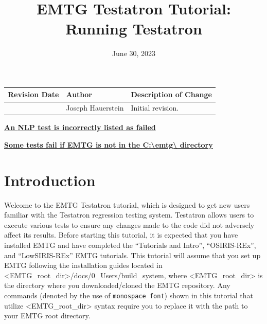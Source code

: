 \documentclass[11pt]{article}
\title{\Huge EMTG Testatron Tutorial: Running Testatron}
\newcommand{\knownissue}[3]
{
	\refstepcounter{knownissues}
	\par\noindent\textbf{\hyperref[#2_b]{\theknownissues\quad #1}}\label{#2_h}
	\textbf{\hfill\pageref{#2_b}}
	#3
}
\begin{document}
\begin{titlepage}
\maketitle
\thispagestyle{empty}
\begin{table}[H]
	\centering
	\begin{tabularx}{\textwidth}{|l|l|X|}
		\hline
		\textbf{Revision Date} & \textbf{Author} & \textbf{Description of Change} \\
		\hline
		\date{June 30, 2023} & Joseph Hauerstein & Initial revision.\\ 
		\hline
	\end{tabularx}
\end{table}
\end{titlepage}

\newpage
\tableofcontents
\thispagestyle{empty}
\newpage

\listofknownissues
\thispagestyle{empty}

\knownissue{An \acs{NLP} test is incorrectly listed as failed}{known_failing_test}
\knownissue{Some tests fail if EMTG is not in the C:\textbackslash emtg\textbackslash{} directory}{tests_require_specific_dir}

\newpage
\clearpage
\setcounter{page}{1}


\section{Introduction}
\label{sec:introduction}

Welcome to the \ac{EMTG} Testatron tutorial, which is designed to get new users familiar with the Testatron regression testing system. Testatron allows users to execute various tests to ensure any changes made to the code did not adversely affect its results. Before starting this tutorial, it is expected that you have installed \ac{EMTG} and have completed the ``Tutorials and Intro'', ``OSIRIS-REx'', and ``LowSIRIS-REx'' \ac{EMTG} tutorials. This tutorial will assume that you set up \ac{EMTG} following the installation guides located in \textless EMTG\_root\_dir\textgreater /docs/0\_Users/build\_system, where \textless EMTG\_root\_dir\textgreater{} is the directory where you downloaded/cloned the \ac{EMTG} repository. Any commands (denoted by the use of \texttt{monospace font}) shown in this tutorial that utilize \textless EMTG\_root\_dir\textgreater{} syntax require you to replace it with the path to your \ac{EMTG} root directory.
\end{document}
